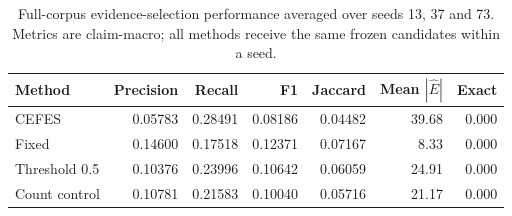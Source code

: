 \begin{table}[!t]
\centering
\caption{Full-corpus evidence-selection performance averaged over seeds 13, 37 and 73. Metrics are claim-macro; all methods receive the same frozen candidates within a seed.}
\label{tab:full-corpus-method-means}
\small
\setlength{\tabcolsep}{7pt}
\begin{tabular}{@{}lrrrrrr@{}}
\toprule
Method & Precision & Recall & F1 & Jaccard & Mean $|\widehat{E}|$ & Exact \\
\midrule
CEFES & 0.05783 & 0.28491 & 0.08186 & 0.04482 & 39.68 & 0.000 \\
Fixed & 0.14600 & 0.17518 & 0.12371 & 0.07167 & 8.33 & 0.000 \\
Threshold 0.5 & 0.10376 & 0.23996 & 0.10642 & 0.06059 & 24.91 & 0.000 \\
Count control & 0.10781 & 0.21583 & 0.10040 & 0.05716 & 21.17 & 0.000 \\
\bottomrule
\end{tabular}
\end{table}
